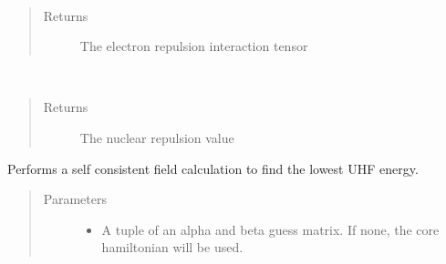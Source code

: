 \documentclass[letterpaper,10pt,english]{sphinxmanual}
\begin{document}
\begin{fulllineitems}
\begin{fulllineitems}
\begin{quote}
\begin{description}
\end{description}\end{quote}

\end{fulllineitems}


\begin{fulllineitems}
\label{\detokenize{UHF:hf.HartreeFock.UHF.MF.get_two_e}}~\begin{quote}\begin{description}
\item[{Returns}] \leavevmode
The electron repulsion interaction tensor

\end{description}\end{quote}

\end{fulllineitems}


\begin{fulllineitems}
\label{\detokenize{UHF:hf.HartreeFock.UHF.MF.nuc_rep}}~\begin{quote}\begin{description}
\item[{Returns}] \leavevmode
The nuclear repulsion value

\end{description}\end{quote}

\end{fulllineitems}


\begin{fulllineitems}
\label{\detokenize{UHF:hf.HartreeFock.UHF.MF.scf}}
Performs a self consistent field calculation to find the lowest UHF energy.
\begin{quote}\begin{description}
\item[{Parameters}] \leavevmode\begin{itemize}
\item {} 
 \textendash{} A tuple of an alpha and beta guess matrix. If none, the core hamiltonian will be used.


\end{itemize}
\end{description}
\end{quote}
\end{fulllineitems}
\end{fulllineitems}
\end{document}
